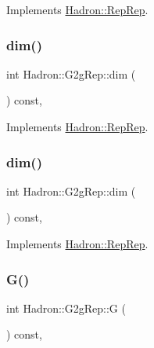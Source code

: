 Implements \mbox{\hyperlink{structHadron_1_1RepRep_a92c8802e5ed7afd7da43ccfd5b7cd92b}{Hadron\+::\+Rep\+Rep}}.

\mbox{\label{structHadron_1_1G2gRep_a8aa2fce05b77da3aab118ec1e5f16687}} 
\subsubsection{\texorpdfstring{dim()}{dim()}\hspace{0.1cm}{\footnotesize\ttfamily [4/5]}}
{\footnotesize\ttfamily int Hadron\+::\+G2g\+Rep\+::dim (\begin{DoxyParamCaption}{ }\end{DoxyParamCaption}) const\hspace{0.3cm}{\ttfamily [inline]}, {\ttfamily [virtual]}}



Implements \mbox{\hyperlink{structHadron_1_1RepRep_a92c8802e5ed7afd7da43ccfd5b7cd92b}{Hadron\+::\+Rep\+Rep}}.

\mbox{\label{structHadron_1_1G2gRep_a8aa2fce05b77da3aab118ec1e5f16687}} 
\subsubsection{\texorpdfstring{dim()}{dim()}\hspace{0.1cm}{\footnotesize\ttfamily [5/5]}}
{\footnotesize\ttfamily int Hadron\+::\+G2g\+Rep\+::dim (\begin{DoxyParamCaption}{ }\end{DoxyParamCaption}) const\hspace{0.3cm}{\ttfamily [inline]}, {\ttfamily [virtual]}}



Implements \mbox{\hyperlink{structHadron_1_1RepRep_a92c8802e5ed7afd7da43ccfd5b7cd92b}{Hadron\+::\+Rep\+Rep}}.

\mbox{\label{structHadron_1_1G2gRep_a417bc3b0be59398720597ac859ab6b69}} 
\subsubsection{\texorpdfstring{G()}{G()}\hspace{0.1cm}{\footnotesize\ttfamily [1/3]}}
{\footnotesize\ttfamily int Hadron\+::\+G2g\+Rep\+::G (\begin{DoxyParamCaption}{ }\end{DoxyParamCaption}) const\hspace{0.3cm}{\ttfamily [inline]}, {\ttfamily [virtual]}}

